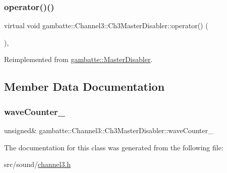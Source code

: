 \subsubsection{\texorpdfstring{operator()()}{operator()()}}
{\footnotesize\ttfamily virtual void gambatte\+::\+Channel3\+::\+Ch3\+Master\+Disabler\+::operator() (\begin{DoxyParamCaption}{ }\end{DoxyParamCaption})\hspace{0.3cm}{\ttfamily [inline]}, {\ttfamily [virtual]}}



Reimplemented from \hyperlink{classgambatte_1_1MasterDisabler_a6b69f64af3e8112eac3767a74ee0e322}{gambatte\+::\+Master\+Disabler}.



\subsection{Member Data Documentation}
\mbox{\label{classgambatte_1_1Channel3_1_1Ch3MasterDisabler_a2b80dcc2777c8a7610b654de40e99440}} 
\subsubsection{\texorpdfstring{wave\+Counter\+\_\+}{waveCounter\_}}
{\footnotesize\ttfamily unsigned\& gambatte\+::\+Channel3\+::\+Ch3\+Master\+Disabler\+::wave\+Counter\+\_\+\hspace{0.3cm}{\ttfamily [private]}}



The documentation for this class was generated from the following file\+:\begin{DoxyCompactItemize}
\item 
src/sound/\hyperlink{channel3_8h}{channel3.\+h}\end{DoxyCompactItemize}

